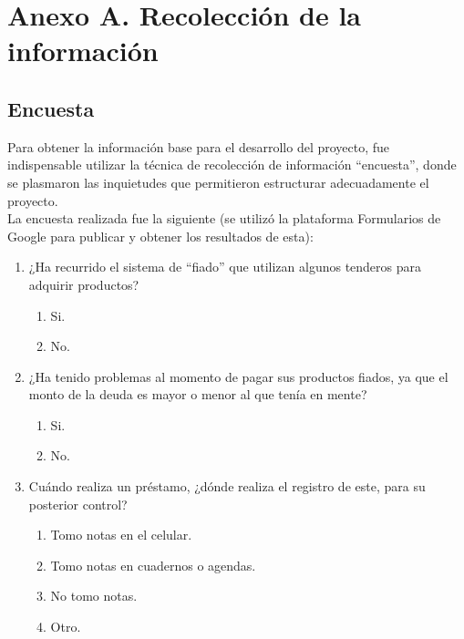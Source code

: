 \section*{Anexo A. Recolección de la información}

	\subsection*{Encuesta}
	
	{Para obtener la información base para el desarrollo del proyecto, fue indispensable utilizar la técnica de recolección de información “encuesta”, donde se plasmaron las inquietudes que permitieron estructurar adecuadamente el proyecto.\\
		
	La encuesta realizada fue la siguiente (se utilizó la plataforma Formularios de Google para publicar y obtener los resultados de esta):
	
	\begin{enumerate}
		
		\item ¿Ha recurrido el sistema de “fiado” que utilizan algunos tenderos para adquirir productos?
		
			\begin{enumerate}
				\item Si.
				\item No.
			\end{enumerate}
		
		\item ¿Ha tenido problemas al momento de pagar sus productos fiados, ya que el monto de la deuda es mayor o menor al que tenía en mente?
		
			\begin{enumerate}
				\item Si.
				\item No.
			\end{enumerate}	
		
		\item Cuándo realiza un préstamo, ¿dónde realiza el registro de este, para su posterior control?
			
			\begin{enumerate}
				\item Tomo notas en el celular.
				\item Tomo notas en cuadernos o agendas.
				\item No tomo notas.
				\item Otro.
			\end{enumerate}
		

\end{enumerate}}

